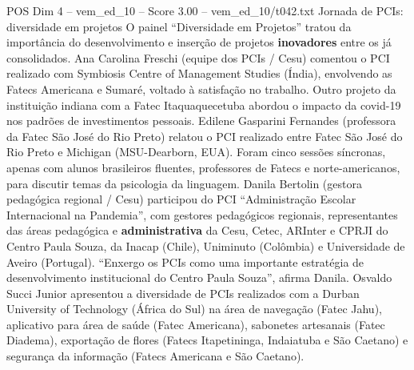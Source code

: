 \begin{textsample}{POS Dim 4 – vem\_ed\_10 – Score 3.00 – vem\_ed\_10/t042.txt}  \label{ex:f4_pos_135}
Jornada de PCIs: diversidade em projetos O painel “Diversidade em Projetos” tratou da importância do desenvolvimento e inserção de projetos \textbf{inovadores} entre os já consolidados.
Ana Carolina Freschi (equipe dos PCIs / Cesu) comentou o PCI realizado com Symbiosis Centre of Management Studies (Índia), envolvendo as Fatecs Americana e Sumaré, voltado à satisfação no trabalho.
Outro projeto da instituição indiana com a Fatec Itaquaquecetuba abordou o impacto da covid-19 nos padrões de investimentos pessoais.
Edilene Gasparini Fernandes (professora da Fatec São José do Rio Preto) relatou o PCI realizado entre Fatec São José do Rio Preto e Michigan (MSU-Dearborn, EUA).
Foram cinco sessões síncronas, apenas com alunos brasileiros fluentes, professores de Fatecs e norte-americanos, para discutir temas da psicologia da linguagem.
Danila Bertolin (gestora pedagógica regional / Cesu) participou do PCI “Administração Escolar Internacional na Pandemia”, com gestores pedagógicos regionais, representantes das áreas pedagógica e \textbf{administrativa} da Cesu, Cetec, ARInter e CPRJI do Centro Paula Souza, da Inacap (Chile), Uniminuto (Colômbia) e Universidade de Aveiro (Portugal). “Enxergo os PCIs como uma importante estratégia de desenvolvimento institucional do Centro Paula Souza”, afirma Danila.
Osvaldo Succi Junior apresentou a diversidade de PCIs realizados com a Durban University of Technology (África do Sul) na área de navegação (Fatec Jahu), aplicativo para área de saúde (Fatec Americana), sabonetes artesanais (Fatec Diadema), exportação de flores (Fatecs Itapetininga, Indaiatuba e São Caetano) e segurança da informação (Fatecs Americana e São Caetano).

\end{textsample}
